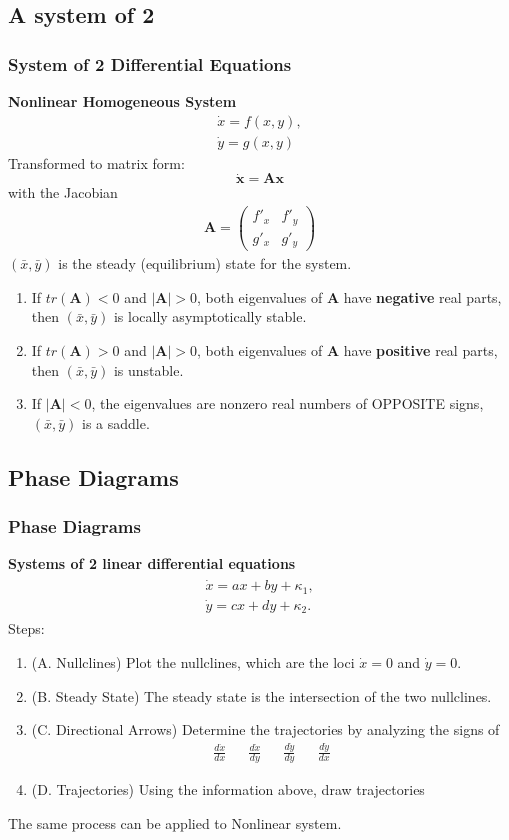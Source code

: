 \documentclass[
10pt, %
]{beamer}
\def\A{\mathbf A}
\begin{document}
\subsection{A system of 2}
\begin{frame}
\frametitle{System of 2 Differential Equations}
\textbf{Nonlinear Homogeneous System}
	\begin{align*}
		\dot{x} = f(x,y), \\
		\dot{y} = g(x,y)
	\end{align*}
Transformed to matrix form:
\[
\dot{\mathbf{x}} = \mathbf{A} \mathbf{x}
\]
with the Jacobian
\begin{align*}
		\A = 
		\begin{pmatrix}
			 f'_x & f'_y \\ g'_x & g'_y
		\end{pmatrix}
\end{align*}
$(\bar{x}, \bar{y})$ is the steady (equilibrium) state for the system.
	\begin{enumerate}
		\item If $tr(\A) < 0$ and $|\A| > 0$, both eigenvalues of $\A$ have \textbf{negative} real parts, then $(\bar{x}, \bar{y})$ is locally asymptotically stable.
		\item If $tr(\A) > 0$ and $|\A| > 0$, both eigenvalues of $\A$ have \textbf{positive} real parts, then $(\bar{x}, \bar{y})$ is unstable.
		\item If $|\A| < 0$, the eigenvalues are nonzero real numbers of OPPOSITE signs, $(\bar{x}, \bar{y})$ is a saddle.
	\end{enumerate}
\end{frame}

\subsection{Phase Diagrams}
\begin{frame}
	\frametitle{Phase Diagrams}
	\textbf{Systems of 2 linear differential equations}
	\begin{align}
		\begin{matrix}
			\dot{x} = a x + b y + \kappa_1, \\
		\dot{y} = c x + d y + \kappa_2. 
		\end{matrix} \label{phase_sys}
	\end{align}
	Steps:
	\begin{enumerate}
		\item (A. Nullclines) Plot the nullclines, which are the loci $\dot{x}=0$ and $\dot{y}=0$. 
		\item (B. Steady State) The steady state is the intersection of the two nullclines.
		\item (C. Directional Arrows) Determine the trajectories by analyzing the signs of
		\begin{align*}
				\frac{d \dot{x}}{dx} && \frac{d \dot{x}}{dy} && \frac{d \dot{y}}{dy} && \frac{d\dot{y}}{dx}  
			\end{align*}
		\item (D. Trajectories) Using the information above, draw trajectories
	\end{enumerate}
	The same process can be applied to Nonlinear system.
\end{frame}
\end{document}
